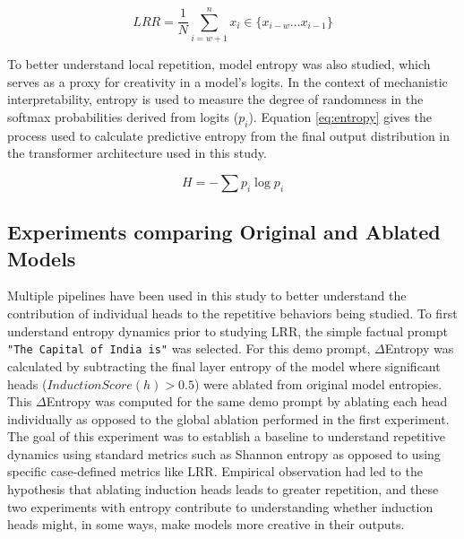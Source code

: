 \documentclass[twocolumn]{article}
\begin{document}
\begin{equation}
LRR = \frac{1}{N} \sum_{i=w+1}^{n} x_i \in \{x_{i-w} \dots x_{i-1}\}
\label{eq:lrr}
\end{equation}

To better understand local repetition, model entropy was also studied, which serves as a proxy for creativity in a model's logits. In the context of mechanistic interpretability, entropy is used to measure the degree of randomness in the softmax probabilities derived from logits ($p_i$). Equation \ref{eq:entropy} gives the process used to calculate predictive entropy from the final output distribution in the transformer architecture used in this study.

\begin{equation}
    H = -\sum p_i \log p_i
    \label{eq:entropy}
\end{equation}



\subsection{Experiments comparing Original and Ablated Models}
\label{sec:2.3}

Multiple pipelines have been used in this study to better understand the contribution of individual heads to the repetitive behaviors being studied. To first understand entropy dynamics prior to studying LRR, the simple factual prompt \texttt{"The Capital of India is"} was selected. For this demo prompt, $\Delta$Entropy was calculated by subtracting the final layer entropy of the model where significant heads ($InductionScore(h) > 0.5$) were ablated from original model entropies. This $\Delta$Entropy was computed for the same demo prompt by ablating each head individually as opposed to the global ablation performed in the first experiment. The goal of this experiment was to establish a baseline to understand repetitive dynamics using standard metrics such as Shannon entropy as opposed to using specific case-defined metrics like LRR. Empirical observation had led to the hypothesis that ablating induction heads leads to greater repetition, and these two experiments with entropy contribute to understanding whether induction heads might, in some ways, make models more creative in their outputs. \\
\end{document}
